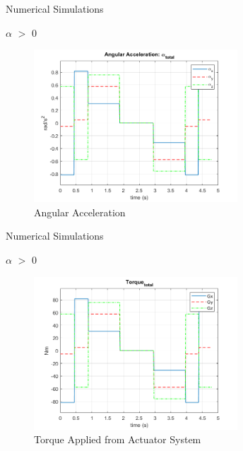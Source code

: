 \documentclass{beamer}
\begin{document}
\begin{frame}{Numerical Simulations}
	\begin{block}{$\alpha$ $>$ 0}
		
		
		\begin{figure}[H]
			\label{fig:ang_accel_total}
			\begin{center}
				\includegraphics[width=3in]{figures/alphaNot0/ang_accel_total.png}
			\end{center}
			\caption{Angular Acceleration}
		\end{figure}
		
	\end{block}
\end{frame}
\begin{frame}{Numerical Simulations}
\begin{block}{$\alpha$ $>$ 0}
	
	\begin{figure}[H]
		\label{fig:torque_total}
		\begin{center}
			\includegraphics[width=3in]{figures/alphaNot0/torque_total.png}
		\end{center}
		\caption{Torque Applied from Actuator System}
	\end{figure}
	
\end{block}
\end{frame}
\end{document}
